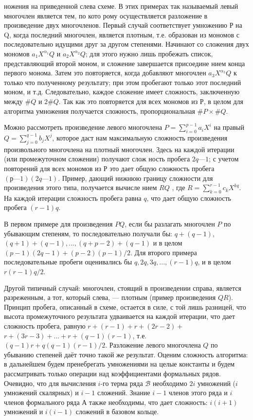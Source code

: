 \noindent
ножения на приведенной сле­ва схеме. В этих примерах так называемый левый много­член является тем, по кото­
рому осуществляется разложе­ние в произведение двух мно­гочленов. Первый случай со­ответствует умножению Р на Q, когда последний многочлен, является плотным, т.е. образо­ван из мономов с последова­тельно идущими друг за другом степенями. Начинают со сложения двух
мономов $a_{1}X^{\alpha _1}Q$ и $a_{2}X^{\alpha _2}Q$; для этого нужно лишь пробежать список,
представляющий второй моном, и сложение завершается присоедине­
нием конца первого монома. Затем это повторяется, когда добавляют
многочлен $a_{3}X^{\alpha _3}Q$  к только что полученному результату; при этом пробегают только этот последний моном, и т.д. Следовательно, каждое
сложение имеет сложность, заключенную между $\#Q$ и $2\#Q$. Так как это
повторяется для всех мономов из $Р$, в целом для алгоритма умножения
получается сложность, пропорциональная $\#P \times \#Q$.
\par Можно рассмотреть произведение левого многочлена $ P =\sum^{p-1}_{i=0}a_{i}X^i$ на правый $Q =\sum^{q-1}_{j=0}b_{j}X^{j} $, которое даст нам максимальную сложность
произведения произвольного многочлена на плотный многочлен. Здесь
на каждой итерации (или промежуточном сложении) получают слож­
ность пробега $2q — 1$; с учетом повторений для всех мономов из $Р$ это дает общую сложность пробега $(р— 1)(2q — 1)$. Пример, дающий нижнюю
границу сложности для произведения этого типа, получается вычисле­
нием $RQ$ , где $R =\sum^{r-1}_{k=0}c_{k}X^{kq}$. На каждой итерации сложность пробега
равна $q$, что дает общую сложность пробега $(r - 1)q$.
\par В первом примере для произведения $PQ$, если бы разлагать мно­гочлен $P$ по убывающим степеням, то последовательно получали бы: $q + (q - 1)$, \linebreak $(q + 1) + (q - 1), ..., (q + p - 2) + (q - 1)$ и в целом $(p - 1)(2q - 1) + (p - 2)(p - 1)/2 $. Для второго примера последовательные пробеги
оценивались бы $q, 2q, 3q, ..., (r - 1)q$, и в целом $r(r - 1)q/2$.
\par Другой типичный случай: многочлен, стоящий в произведении спра­ва, является разреженным, а тот, который слева, — плотным (пример
произведения $QR$). Принцип пробега, описанный в схеме, остается в
силе, с той лишь разницей, что высота промежуточного результата
удваивается на каждой итерации, что дает сложность пробега, равную
$r + (r - 1) + r + (2r - 2) +$ \linebreak $r + (3r - 3) + ... + r + (q - 1)(r - 1)$, т.е. $(q - 1)r + q(q - 1)(r - 1)/2$. Разложение левого многочлена $Q$ по убыванию степеней даёт точно такой же результат.
\newline
\noindent Оценим сложность алгоритма: в дальнейшем будем пренебрегать умножениями на целые константы и будем рассматривать только операции
над коэффициентами формальных рядов. Очевидно, что для вычисле­ния $i$-го терма ряда $\mathcal{B}$ необходимо $2i$ умножений ($i$ умножений скалярных) и $i-1$ сложений. Знание $i-1$ членов этого ряда и $i$ членов
формального ряда А также необходимы, что дает сложность: $i(i+1)$
умножений и $i(i-1)$ сложений в базовом кольце.

